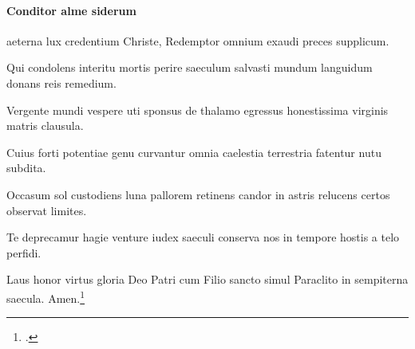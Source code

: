 \paragraph{Conditor alme siderum}
aeterna lux credentium
Christe, Redemptor omnium
exaudi preces supplicum.

Qui condolens interitu
mortis perire saeculum
salvasti mundum languidum
donans reis remedium.

Vergente mundi vespere
uti sponsus de thalamo
egressus honestissima
virginis matris clausula.

Cuius forti potentiae
genu curvantur omnia
caelestia terrestria
fatentur nutu subdita.

Occasum sol custodiens
luna pallorem retinens
candor in astris relucens
certos observat limites.

Te deprecamur hagie
venture iudex saeculi
conserva nos in tempore
hostis a telo perfidi.

Laus honor virtus gloria
Deo Patri cum Filio
sancto simul Paraclito
in sempiterna saecula. Amen.\footcite[67r]{bp1502}
